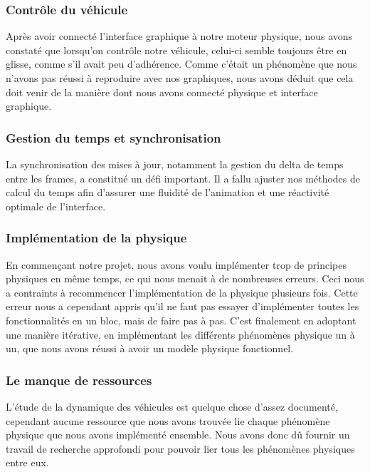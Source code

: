 \subsubsection{Contrôle du véhicule}\label{subsubsec:ctrlVehicule}
Après avoir connecté l'interface graphique à notre moteur physique, nous avons constaté que lorsqu'on contrôle notre véhicule, celui-ci semble toujours être en glisse, comme s'il avait peu d'adhérence.
Comme c'était un phénomène que nous n'avons pas réussi à reproduire avec nos graphiques, nous avons déduit que cela doit venir de la manière dont nous avons connecté physique et interface graphique.

\subsubsection{Gestion du temps et synchronisation}\label{subsubsec:la-gestion-du-temps}
La synchronisation des mises à jour, notamment la gestion du delta de temps entre les frames, a constitué un défi important.
Il a fallu ajuster nos méthodes de calcul du temps afin d’assurer une fluidité de l’animation et une réactivité optimale de l’interface.

\subsubsection{Implémentation de la physique}\label{subsubsec:implem-phys}
En commençant notre projet, nous avons voulu implémenter trop de principes physiques en même temps, ce qui nous menait à de nombreuses erreurs.
Ceci nous a contraints à recommencer l'implémentation de la physique plusieurs fois.
Cette erreur nous a cependant appris qu'il ne faut pas essayer d'implémenter toutes les fonctionnalités en un bloc, mais de faire pas à pas.
C'est finalement en adoptant une manière itérative, en implémentant les différents phénomènes physique un à un, que nous avons réussi à avoir un modèle physique fonctionnel.

\subsubsection{Le manque de ressources}\label{subsubsec:manque-ressources}
L'étude de la dynamique des véhicules est quelque chose d'assez documenté, cependant aucune ressource que nous avons trouvée lie chaque phénomène physique que nous avons implémenté ensemble.
Nous avons donc dû fournir un travail de recherche approfondi pour pouvoir lier tous les phénomènes physiques entre eux.

